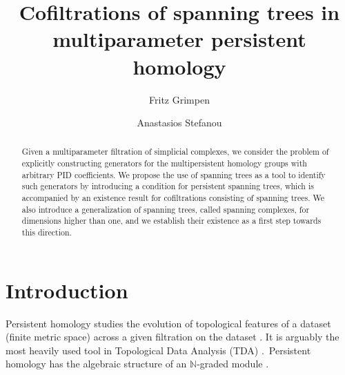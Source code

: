 \documentclass[oneside]{amsart}
\theoremstyle{definition}
\begin{document}
\title[Cofiltrations of spanning trees]{Cofiltrations of spanning trees in multiparameter persistent homology}
\author{Fritz Grimpen}
\address{Institute for Algebra, Geometry, Topology and its Applications (ALTA), Department of Mathematics, University of Bremen, Germany}
\author{Anastasios Stefanou}
\address{Institute for Algebra, Geometry, Topology and its Applications (ALTA), Department of Mathematics and Computer Science, University of Bremen, Germany}
\begin{abstract}
    Given a multiparameter filtration of simplicial complexes, we consider the problem of explicitly constructing generators for the multipersistent homology groups with arbitrary PID coefficients.
    We propose the use of spanning trees as a tool to identify such generators by introducing a condition for persistent spanning trees, which is accompanied by an existence result for cofiltrations consisting of spanning trees.
    We also introduce a generalization of spanning trees, called spanning complexes, for dimensions higher than one, and we establish their existence as a first step towards this direction.
\end{abstract}
\maketitle

\tableofcontents

\section{Introduction}
Persistent homology studies the evolution of topological features of a dataset (finite metric space) across a given filtration on the dataset \cite{EdelsbrunnerLetscherZomorodian2002}. 
It is arguably the most heavily used tool in Topological Data Analysis (TDA) \cite{Carlsson2009,EdelsbrunnerHarer2010}.~Persistent homology has the algebraic structure of an $\mathbb{N}$-graded module \cite{CarlssonZomorodianCollinsGuibas2005}.
 
\end{document}

